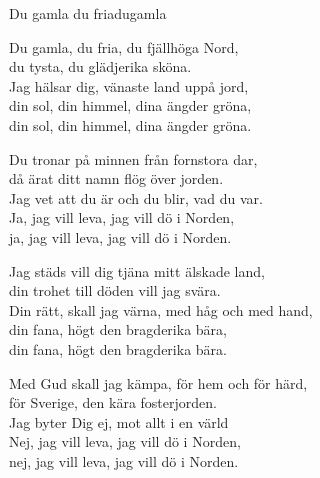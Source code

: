 \begin{song}{Du gamla du fria}{dugamla}
\begin{vers}
Du gamla, du fria, du fjällhöga Nord,\\
du tysta, du glädjerika sköna.\\
Jag hälsar dig, vänaste land uppå jord,\\
din sol, din himmel, dina ängder gröna,\\
din sol, din himmel, dina ängder gröna.\\
\end{vers}
\begin{vers}
Du tronar på minnen från fornstora dar,\\
då ärat ditt namn flög över jorden.\\
Jag vet att du är och du blir, vad du var.\\
Ja, jag vill leva, jag vill dö i Norden,\\
ja, jag vill leva, jag vill dö i Norden.\\
\end{vers}
\begin{vers}
Jag städs vill dig tjäna mitt älskade land,\\
din trohet till döden vill jag svära.\\
Din rätt, skall jag värna, med håg och med hand,\\
din fana, högt den bragderika bära,\\
din fana, högt den bragderika bära.\\
\end{vers}
\begin{vers}
Med Gud skall jag kämpa, för hem och för härd,\\ 
för Sverige, den kära fosterjorden.\\ 
Jag byter Dig ej, mot allt i en värld\\ 
Nej, jag vill leva, jag vill dö i Norden,\\
nej, jag vill leva, jag vill dö i Norden.\\
\end{vers}
\end{song}

\newpage

